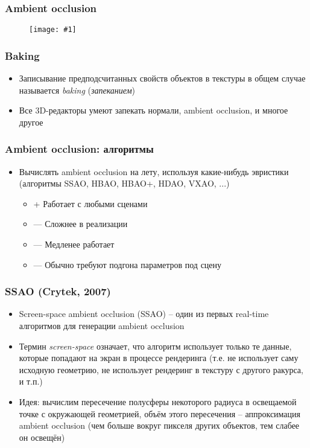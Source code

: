 \documentclass[10pt]{beamer}
\newcommand{\slideimage}[1]{
  \begin{figure}
    \begin{adjustbox}{width=\textwidth, totalheight=\textheight-2\baselineskip-2\baselineskip,keepaspectratio}
      \texttt{[image: \#1]}
    \end{adjustbox}
  \end{figure}
}
\begin{document}
\begin{frame}[fragile]
\frametitle{Ambient occlusion}
\slideimage{baked-ao.png}
\end{frame}

\begin{frame}[fragile]
\frametitle{Baking}
\begin{itemize}
\item Записывание предподсчитанных свойств объектов в текстуры в общем случае называется \textit{baking} (\textit{запеканием})
\pause
\item Все 3D-редакторы умеют запекать нормали, ambient occlusion, и многое другое
\end{itemize}
\end{frame}

\begin{frame}[fragile]
\frametitle{Ambient occlusion: алгоритмы}
\begin{itemize}
\item Вычислять ambient occlusion на лету, используя какие-нибудь эвристики (алгоритмы SSAO, HBAO, HBAO+, HDAO, VXAO, ...)
\pause
\begin{itemize}
\item {\color{green}+} Работает с любыми сценами
\item {\color{red}—} Сложнее в реализации
\item {\color{red}—} Медленее работает
\item {\color{red}—} Обычно требуют подгона параметров под сцену
\end{itemize}
\end{itemize}
\end{frame}

\begin{frame}[fragile]
\frametitle{SSAO (Crytek, 2007)}
\begin{itemize}
\item Screen-space ambient occlusion (SSAO) -- один из первых real-time алгоритмов для генерации ambient occlusion
\pause
\item Термин \textit{screen-space} означает, что алгоритм использует только те данные, которые попадают на экран в процессе рендеринга (т.е. не использует саму исходную геометрию, не использует рендеринг в текстуру с другого ракурса, и т.п.)
\pause
\item Идея: вычислим пересечение полусферы некоторого радиуса в освещаемой точке с окружающей геометрией, объём этого пересечения -- аппроксимация ambient occlusion (чем больше вокруг пикселя других объектов, тем слабее он освещён)
\end{itemize}
\end{frame}
\end{document}
